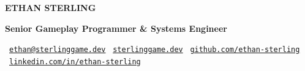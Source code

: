 \documentclass[10pt]{article}
\begin{document}
\pagestyle{empty}

\begin{tcolorbox}[
    colback=primary,
    colframe=primary,
    arc=4pt,
    boxrule=0pt,
    top=12pt,
    bottom=12pt,
    left=15pt,
    right=15pt,
]
    {\color{white}
        {\Huge\bfseries ETHAN STERLING}\par
        \vspace{4pt}
        {\large\bfseries\textcolor{headeraccent}{Senior Gameplay Programmer \& Systems Engineer}}\par
        \vspace{8pt}
        \small
        \faEnvelope\ \href{mailto:ethan@sterlinggame.dev}{\texttt{ethan@sterlinggame.dev}} \hfill
        \faGlobe\ \href{https://sterlinggame.dev}{\texttt{sterlinggame.dev}} \hfill
        \faGithub\ \href{https://github.com/ethan-sterling}{\texttt{github.com/ethan-sterling}} \hfill
        \faLinkedin\ \href{https://linkedin.com/in/ethan-sterling-game}{\texttt{linkedin.com/in/ethan-sterling}}
    }
\end{tcolorbox}

\vspace{10pt}
\end{document}
